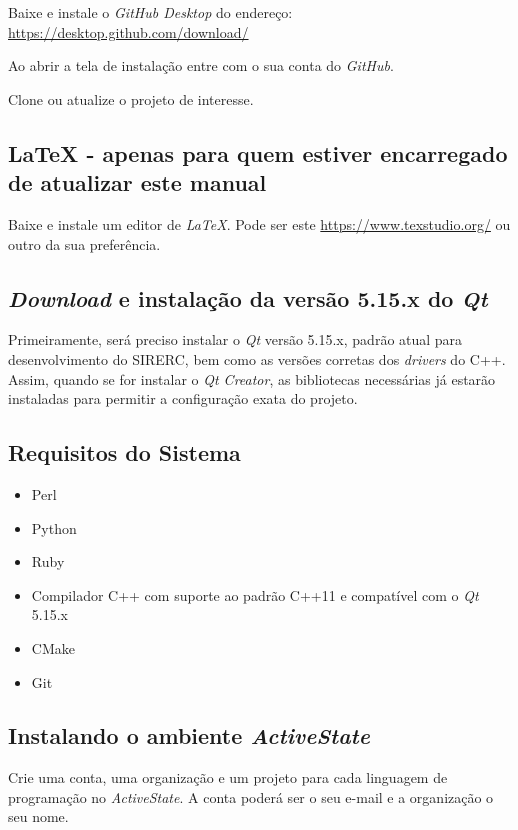 \documentclass[a4paper,11pt]{article}
\newcommand{\sistema}{\textsf{SIRERC}}
\newcommand{\qtcreator}{\textit{Qt Creator}}
\newcommand{\qt}{\textit{Qt}}
\newcommand{\github}{\textit{GitHub}}
\begin{document}
Baixe e instale o \textit{GitHub Desktop} do endereço: \url{https://desktop.github.com/download/}

Ao abrir a tela de instalação entre com o sua conta do \github{}.

Clone ou atualize o projeto de interesse.


\subsection*{LaTeX - apenas para quem estiver encarregado de atualizar este manual}

Baixe e instale um editor de \textit{LaTeX}. Pode ser este \url{https://www.texstudio.org/} ou outro da sua preferência.

\subsection{\textit{Download} e instalação da versão 5.15.x do \qt{}}

Primeiramente, será preciso instalar o \qt{} versão 5.15.x, padrão atual para desenvolvimento do \sistema{}, bem como as versões corretas dos \textit{drivers} do C++. Assim, quando se for instalar o \qtcreator{}, as bibliotecas necessárias já estarão instaladas para permitir a configuração exata do projeto.


\subsection*{Requisitos do Sistema}

\begin{itemize}
	\item Perl
	\item Python
	\item Ruby
	\item Compilador C++ com suporte ao padrão C++11 e compatível com o \qt{} 5.15.x
	\item CMake
	\item Git
\end{itemize}

\subsection*{Instalando o ambiente \textit{ActiveState}}

Crie uma conta, uma organização e um projeto para cada linguagem de programação no \textit{ActiveState}. A conta poderá ser o seu e-mail e a organização o seu nome.
\end{document}
